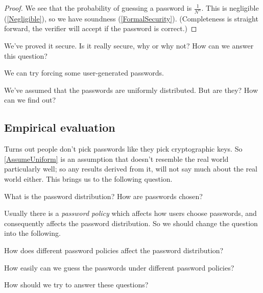 \begin{frame}
  \begin{proof}
    We see that the probability of guessing a password is \(\frac{1}{N^n}\).
    This is negligible (\cref{Negligible}), so we have soundness 
    (\cref{FormalSecurity}).
    (Completeness is straight forward, the verifier will accept if the password 
    is correct.)
  \end{proof}
\end{frame}

\begin{frame}
  \begin{exercise}
    We've proved it secure.
    Is it really secure, why or why not?
    How can we answer this question?
  \end{exercise}

  \begin{solution}
    We can try forcing some user-generated passwords.

    We've assumed that the passwords are uniformly distributed.
    But are they?
    How can we find out?
  \end{solution}
\end{frame}

\subsection{Empirical evaluation}

Turns out people don't pick passwords like they pick cryptographic keys.
So \cref{AssumeUniform} is an assumption that doesn't resemble the real world 
particularly well; so any results derived from it, will not say much about the 
real world either.
This brings us to the following question.

\begin{frame}
\begin{question}\label{PasswordDistribution}
  What is the password distribution?
  How are passwords chosen?
\end{question}
\end{frame}

Usually there is a \emph{password policy} which affects how users choose 
passwords, and consequently affects the password distribution.
So we should change the question into the following.

\begin{frame}
\begin{question}
  How does different password policies affect the password distribution?
\end{question}
\begin{question}\label{Guessability}
  How easily can we guess the passwords under different password policies?
\end{question}
\begin{exercise}
  How should we try to answer these questions?
\end{exercise}
\end{frame}

